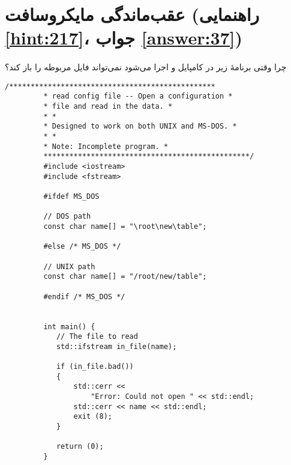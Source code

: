 \section[عقب‌ماندگی مایکروسافت]{عقب‌ماندگی مایکروسافت \protect{} (راهنمایی \ref{hint:217}، جواب \ref{answer:37})}
\paragraph{}\label{prog:47}
چرا وقتی برنامهٔ زیر در  کامپایل و اجرا می‌شود نمی‌تواند فایل مربوطه را باز کند؟

\begin{LTR}
    \begin{lstlisting}[style=C++Style]
        /************************************************
         * read config file -- Open a configuration *
         * file and read in the data. *
         * *
         * Designed to work on both UNIX and MS-DOS. *
         * *
         * Note: Incomplete program. *
         ************************************************/
         #include <iostream>
         #include <fstream>

         #ifdef MS_DOS

         // DOS path
         const char name[] = "\root\new\table";

         #else /* MS_DOS */

         // UNIX path
         const char name[] = "/root/new/table";

         #endif /* MS_DOS */


         int main() {
         	// The file to read
         	std::ifstream in_file(name);

         	if (in_file.bad())
         	{
         		std::cerr <<
         			"Error: Could not open " << std::endl;
         		std::cerr << name << std::endl;
         		exit (8);
         	}

         	return (0);
         }
    \end{lstlisting}
\end{LTR}